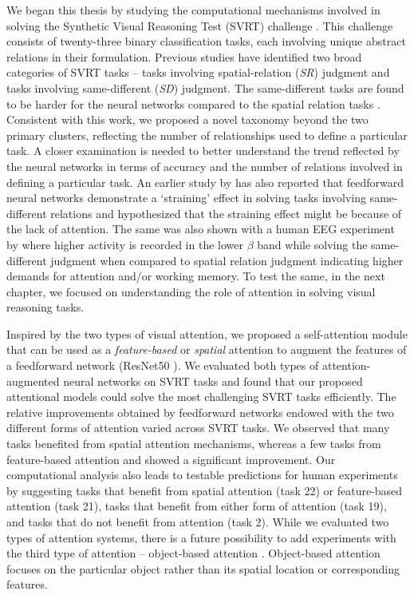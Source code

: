We began this thesis by studying the computational mechanisms involved in solving the Synthetic Visual Reasoning Test (SVRT) challenge \citep{fleuret2011comparing}. This challenge consists of twenty-three binary classification tasks, each involving unique abstract relations in their formulation. Previous studies have identified two broad categories of SVRT tasks \citep{Stabinger2016,kim2018not,yihe2019program} -- tasks involving spatial-relation (\textit{SR}) judgment and tasks involving same-different (\textit{SD}) judgment. The same-different tasks are found to be harder for the neural networks compared to the spatial relation tasks \citep{Ellis2015UnsupervisedLB,kim2018not,stabinger201625,stabinger2021evaluating,Puebla2021.04.06.438551,messina2021recurrent,vaishnav2021understanding}. Consistent with this work, we proposed a novel taxonomy beyond the two primary clusters, reflecting the number of relationships used to define a particular task. A closer examination is needed to better understand the trend reflected by the neural networks in terms of accuracy and the number of relations involved in defining a particular task. An earlier study by \citet{kim2018not} has also reported that feedforward neural networks demonstrate a `straining' effect in solving tasks involving same-different relations and hypothesized that the straining effect might be because of the lack of attention. The same was also shown with a human EEG experiment by \citet{alamia2021differential} where higher activity is recorded in the lower $\beta$ band while solving the same-different judgment when compared to spatial relation judgment indicating higher demands for attention and/or working memory. To test the same, in the next chapter, we focused on understanding the role of attention in solving visual reasoning tasks.

Inspired by the two types of visual attention, we proposed a self-attention module that can be used as a \textit{feature-based} or \textit{spatial} attention to augment the features of a feedforward network (ResNet50 \citep{he2016deep}). We evaluated both types of attention-augmented neural networks on SVRT tasks and found that our proposed attentional models could solve the most challenging SVRT tasks efficiently. The relative improvements obtained by feedforward networks endowed with the two different forms of attention varied across SVRT tasks. We observed that many tasks benefited from spatial attention mechanisms, whereas a few tasks from feature-based attention and showed a significant improvement. 
Our computational analysis also leads to testable predictions for human experiments by suggesting tasks that benefit from spatial attention (task 22) or feature-based attention (task 21), tasks that benefit from either form of attention (task 19), and tasks that do not benefit from attention (task 2). While we evaluated two types of attention systems, there is a future possibility to add experiments with the third type of attention -- object-based attention \citep{duncan1984selective,egly1994shifting,vecera1994does,kramer1997object}. Object-based attention focuses on the particular object rather than its spatial location or corresponding features.


